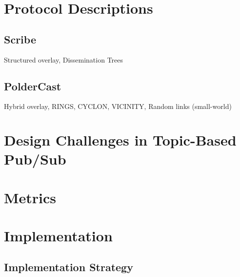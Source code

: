 \documentclass[UKenglish, a4paper]{ifimaster}
\begin{document}
\chapter{Protocol Descriptions}
\label{ch:protocol-descriptions}
\section{Scribe}
Structured overlay, Dissemination Trees
\section{PolderCast}
Hybrid overlay, RINGS, CYCLON, VICINITY, Random links (small-world)

\chapter{Design Challenges in Topic-Based Pub/Sub}
\label{ch:desired-system-properties-and-trade-offs}


\chapter{Metrics}
\label{ch:metrics}


\chapter{Implementation}
\label{ch:implementation}
    \section{Implementation Strategy}
\end{document}

